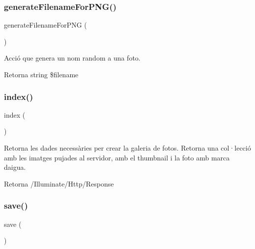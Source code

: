 \subsubsection{\texorpdfstring{generate\+Filename\+For\+P\+N\+G()}{generateFilenameForPNG()}}
{\footnotesize\ttfamily generate\+Filename\+For\+P\+NG (\begin{DoxyParamCaption}{ }\end{DoxyParamCaption})}

Acció que genera un nom random a una foto.

\begin{DoxyReturn}{Retorna}
string \$filename 
\end{DoxyReturn}
\mbox{\label{class_app_1_1_http_1_1_controllers_1_1_image_controller_a149eb92716c1084a935e04a8d95f7347}} 
\subsubsection{\texorpdfstring{index()}{index()}}
{\footnotesize\ttfamily index (\begin{DoxyParamCaption}{ }\end{DoxyParamCaption})}

Retorna les dades necessàries per crear la galeria de fotos. Retorna una col·lecció amb les imatges pujades al servidor, amb el thumbnail i la foto amb marca d\textquotesingle{}aigua.

\begin{DoxyReturn}{Retorna}
/\+Illuminate/\+Http/\+Response 
\end{DoxyReturn}
\mbox{\label{class_app_1_1_http_1_1_controllers_1_1_image_controller_afc8a3c62679cf00ade9f15fb2a6d6132}} 
\subsubsection{\texorpdfstring{save()}{save()}}
{\footnotesize\ttfamily save (\begin{DoxyParamCaption}{ }\end{DoxyParamCaption})}

